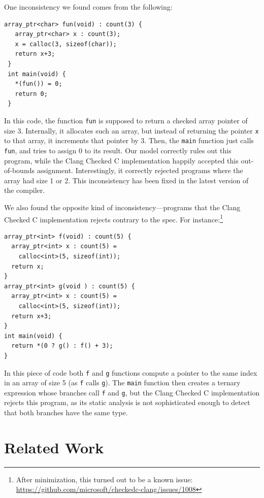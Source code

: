 \documentclass[conference]{IEEEtran}
\newcommand{\code}[1]{\lstinline|#1|}
\begin{document}
One inconsistency we found comes from the following:

{\small 
\begin{lstlisting}[xleftmargin=4 mm]
 array_ptr<char> fun(void) : count(3) {
   array_ptr<char> x : count(3);
   x = calloc(3, sizeof(char));
   return x+3;
 }
 int main(void) {
   *(fun()) = 0;
   return 0;
 }
\end{lstlisting}
}\noindent
In this code, the function \code{fun} is supposed to return a
checked array pointer of size 3. Internally, it allocates such an
array, but instead of returning the pointer \code{x} to that array, it
increments that pointer by 3. Then, the \code{main} function just
calls \code{fun}, and tries to assign 0 to its result. Our model
correctly rules out this program, while the Clang Checked C
implementation happily accepted this out-of-bounds
assignment. Interestingly, it correctly rejected programs where the
array had size 1 or 2. This inconsistency has been fixed in the latest
version of the compiler.

We also found the opposite kind of inconsistency---programs that
the Clang Checked C implementation rejects contrary to the spec.
For instance:\footnote{After minimization, this turned out to be a known issue: 
  \url{https://github.com/microsoft/checkedc-clang/issues/1008}}

{\small 
\begin{lstlisting}[xleftmargin=4 mm]
array_ptr<int> f(void) : count(5) {
  array_ptr<int> x : count(5) =
    calloc<int>(5, sizeof(int)); 
  return x;
}
array_ptr<int> g(void ) : count(5) {
  array_ptr<int> x : count(5) =
    calloc<int>(5, sizeof(int)); 
  return x+3;
}
int main(void) {
  return *(0 ? g() : f() + 3);
}    
\end{lstlisting}
}\noindent
In this piece of code both \code{f} and \code{g} functions compute a
pointer to the same index in an array of size 5 (as \code{f} calls
\code{g}). The \code{main} function then creates a ternary expression
whose branches call \code{f} and \code{g}, but the Clang Checked C
implementation rejects this program, as its static analysis is not
sophisticated enough to detect that both branches have the same type.














 \section{Related Work}
\label{sec:related}
\end{document}
